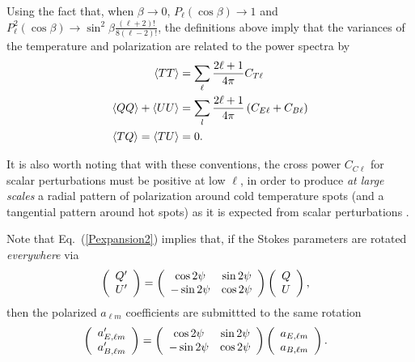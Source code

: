 \documentclass[12pt,twoside]{article}
\newcommand{\myhtmlimage}[1]{ }
\begin{document}
Using the fact that, when $\beta \rightarrow 0$, $P_\ell(\cos\beta) \rightarrow 1$ and $P_\ell^2(\cos
\beta) \rightarrow \sin^2 \beta \frac{(\ell+2)!}{8 (\ell-2)!}$, 
the definitions above imply that the variances of the temperature and
polarization are related to the power spectra by
\begin{align}
\langle TT \rangle &= \sum_\ell {2\ell+1 \over 4 \pi}
C_{T\ell}  \nonumber \\ 
\langle QQ \rangle + \langle UU\rangle &= \sum_l {2\ell+1 \over 4 \pi} \left(C_{E\ell}
+C_{B\ell}\right)  \nonumber \\ 
\langle TQ\rangle = \langle TU\rangle &= 0.\myhtmlimage{}
\label{var}
\end{align}

It is also worth noting that with these conventions, the cross power $C_{C\ell}$
for scalar perturbations
must be positive at low $\ell$, in order to produce {\em at large scales} a radial pattern of
polarization around cold temperature spots (and a tangential pattern around hot
spots) as it is expected from scalar perturbations \citep{crco}.

Note that Eq.~(\ref{Pexpansion2}) implies that, if the Stokes parameters are
rotated {\em everywhere} via
\begin{align}
& \left(\begin{array}{c} 
	Q'\\U'
\end{array}\right) =
\left(\begin{array}{c c}
  	\cos2\psi & \sin2\psi \\ 
	-\sin2\psi & \cos2\psi
\end{array} \right) 
\left(\begin{array}{c} 
	Q\\U
\end{array} \right),\label{eq:rotateQU} %
\end{align}
then the polarized $a_{\ell m}$ coefficients are submittted to the same rotation
\begin{align}
& \left(\begin{array}{c} 
	a_{E,\ell m}'\\a_{B,\ell m}'
\end{array}\right) = 
\left(\begin{array}{c c}
	\cos2\psi & \sin2\psi \\ 
	-\sin2\psi & \cos2\psi
\end{array} \right) 
\left(\begin{array}{c} 
	a_{E,\ell m}\\a_{B,\ell m}
\end{array} \right).\label{eq:rotateEB} %
\end{align}
\end{document}
